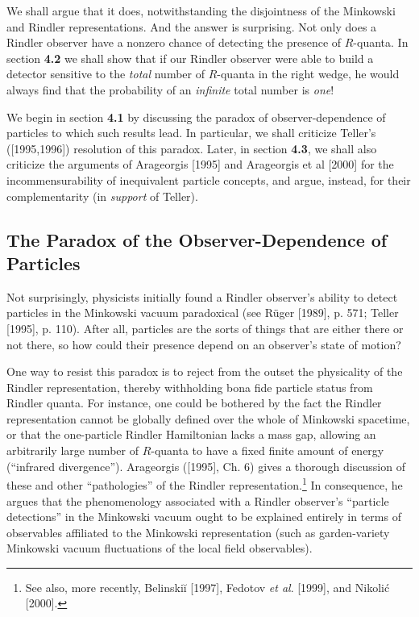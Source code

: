 \documentclass[12pt]{article}
\theoremstyle{remark}
\theoremstyle{definition}
\begin{document}
We shall argue that it does, notwithstanding the disjointness of the 
Minkowski and Rindler representations.  And the answer is surprising.  Not only does a Rindler 
observer have a nonzero chance of detecting the presence of 
$R$-quanta.  In section \textbf{4.2} we shall show that if our 
Rindler observer were able to build a detector sensitive to the 
\emph{total} number of $R$-quanta in the right wedge, he would always 
find that the probability of an \emph{infinite} total number is 
\emph{one}!  

We begin in section \textbf{4.1} by discussing the paradox of 
observer-dependence of particles to which such results  
lead.  In particular, we shall criticize Teller's ([1995,1996]) 
resolution of this paradox.  Later, in section \textbf{4.3}, we shall 
also criticize the arguments of 
Arageorgis [1995] and Arageorgis et al [2000] for the 
incommensurability of inequivalent particle concepts, and argue, 
instead, for their complementarity (in \emph{support} of Teller).   

\subsection{The Paradox of the Observer-Dependence of Particles}

Not surprisingly, physicists initially found a Rindler observer's
ability to detect particles in the Minkowski vacuum paradoxical (see
R\"{u}ger [1989], p. 571; Teller [1995], p. 110).  After all,
particles are the sorts of things that are either there or not there,
so how could their presence depend on an observer's state of motion?

One way to resist this paradox is to reject from the outset the
physicality of the Rindler representation, thereby withholding bona
fide particle status from Rindler quanta.  For instance, one could be
bothered by the fact the Rindler representation cannot be globally
defined over the whole of Minkowski spacetime, or that the
one-particle Rindler Hamiltonian lacks a mass gap, allowing an
arbitrarily large number of $R$-quanta to have a fixed finite amount
of energy (``infrared divergence'').  Arageorgis ([1995], Ch. 6) gives
a thorough discussion of these and other ``pathologies'' of the
Rindler representation.\footnote{See also, more recently,
  Belinski\u{i} [1997], Fedotov \emph{et al}. [1999], and Nikoli\'{c}
  [2000].}  In consequence, he argues that the phenomenology
associated with a Rindler observer's ``particle detections'' in the
Minkowski vacuum ought to be explained entirely in terms of
observables affiliated to the Minkowski representation (such as
garden-variety Minkowski vacuum fluctuations of the local field
observables).
 
\end{document}
